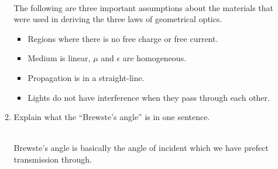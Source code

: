 \documentclass[fleqn]{article}
\begin{document}
\begin{enumerate}
\begin{enumerate}
        \textcolor{hwColor}{
          \\
          The following are three important assumptions about the materials that were used in deriving the three laws of geometrical optics.
          \\
          \begin{itemize}
            \item Regions where there is no free charge or free current.
            \item Medium is linear, $\mu$ and $\epsilon$ are homogeneous.
            \item Propagation is in a straight-line.
            \item Lights do not have interference when they pass through each other.
          \end{itemize}
        }


      \item Explain what the “Brewste's angle” is in one sentence.

        \textcolor{hwColor}{
          \\
          Brewste's angle is basically the angle of incident which we have prefect transmission through. 
        }
      
    \end{enumerate}

  \end{enumerate}
\end{document}
